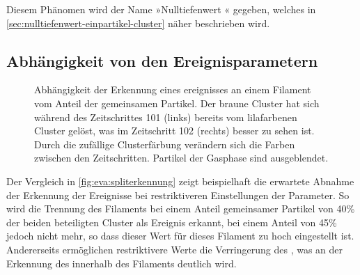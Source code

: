 
Diesem Phänomen wird der Name »Nulltiefenwert « gegeben, welches in \autoref{sec:nulltiefenwert-einpartikel-cluster} näher beschrieben wird.

\subsection*{Abhängigkeit von den Ereignisparametern}\label{eva:ereignis-quali-param}

\begin{figure}
	{\caption{Abhängigkeit der Erkennung eines ereignisses an einem Filament vom Anteil der gemeinsamen Partikel. Der braune Cluster hat sich während des Zeitschrittes 101 (links) bereits vom lilafarbenen Cluster gelöst, was im Zeitschritt 102 (rechts) besser zu sehen ist. Durch die zufällige Clusterfärbung verändern sich die Farben zwischen den Zeitschritten. Partikel der Gasphase sind ausgeblendet.}\label{fig:eva:spliterkennung}}
\end{figure}

Der Vergleich in \autoref{fig:eva:spliterkennung} zeigt beispielhaft die erwartete Abnahme der Erkennung der Ereignisse bei restriktiveren Einstellungen der Parameter. So wird die Trennung des Filaments bei einem Anteil gemeinsamer Partikel von 40\% der beiden beteiligten Cluster als Ereignis erkannt, bei einem Anteil von 45\% jedoch nicht mehr, so dass dieser Wert für dieses Filament zu hoch eingestellt ist.
Andererseits ermöglichen restriktivere Werte die Verringerung des , was an der Erkennung des  innerhalb des Filaments deutlich wird.

